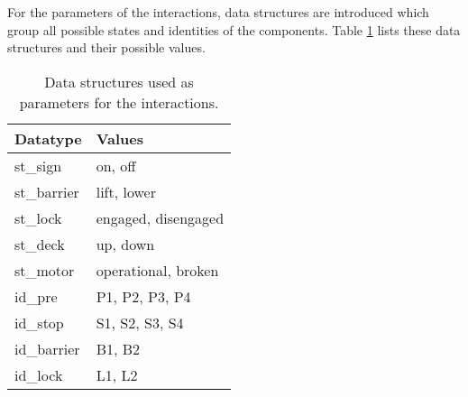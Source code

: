 %
For the parameters of the interactions, data structures are introduced which group all possible states and identities of the components. Table \ref{tab:types} lists these data structures and their possible values.
%
\begin{table}[htb]%
\begin{tabular}{ll}
	\textbf{Datatype} & \textbf{Values}\\
	\hline
	st\_sign & on, off\\
	st\_barrier & lift, lower\\
	st\_lock & engaged, disengaged\\
	st\_deck & up, down\\
	st\_motor & operational, broken\\
	id\_pre & P1, P2, P3, P4\\
	id\_stop & S1, S2, S3, S4\\
	id\_barrier & B1, B2\\
	id\_lock & L1, L2\\
\end{tabular}
\caption{Data structures used as parameters for the interactions.}
\label{tab:types}
\end{table}

